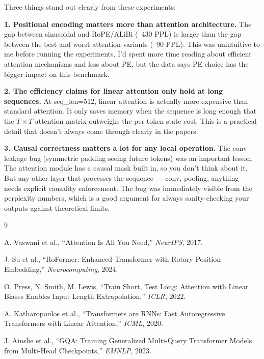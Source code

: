 \documentclass[12pt,a4paper]{article}
\begin{document}
Three things stand out clearly from these experiments:

\textbf{1. Positional encoding matters more than attention architecture.}
The gap between sinusoidal and RoPE/ALiBi (~430 PPL) is larger than the gap between the best and worst attention variants (~90 PPL). This was unintuitive to me before running the experiments. I'd spent more time reading about efficient attention mechanisms and less about PE, but the data says PE choice has the bigger impact on this benchmark.

\textbf{2. The efficiency claims for linear attention only hold at long sequences.}
At seq\_len=512, linear attention is actually more expensive than standard attention. It only saves memory when the sequence is long enough that the $T \times T$ attention matrix outweighs the per-token state cost. This is a practical detail that doesn't always come through clearly in the papers.

\textbf{3. Causal correctness matters a lot for any local operation.}
The conv leakage bug (symmetric padding seeing future tokens) was an important lesson. The attention module has a causal mask built in, so you don't think about it. But any other layer that processes the sequence — conv, pooling, anything — needs explicit causality enforcement. The bug was immediately visible from the perplexity numbers, which is a good argument for always sanity-checking your outputs against theoretical limits.

\begin{thebibliography}{9}

A. Vaswani et al., ``Attention Is All You Need,'' \textit{NeurIPS}, 2017.

J. Su et al., ``RoFormer: Enhanced Transformer with Rotary Position Embedding,''
\textit{Neurocomputing}, 2024.

O. Press, N. Smith, M. Lewis, ``Train Short, Test Long: Attention with Linear
Biases Enables Input Length Extrapolation,'' \textit{ICLR}, 2022.

A. Katharopoulos et al., ``Transformers are RNNs: Fast Autoregressive
Transformers with Linear Attention,'' \textit{ICML}, 2020.

J. Ainslie et al., ``GQA: Training Generalized Multi-Query Transformer Models
from Multi-Head Checkpoints,'' \textit{EMNLP}, 2023.

\end{thebibliography}
\end{document}
